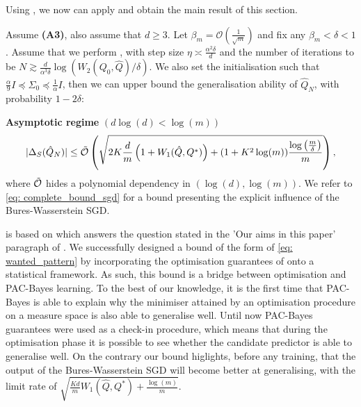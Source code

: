 Using , we now can apply  and obtain the main result of this section.
\begin{theorem}
\label{th: main_sgd}
Assume \textbf{(A3)}, also assume that $d\geq 3$. Let $\beta_m= \mathcal{O}(\frac{1}{\sqrt{m}})$ and fix any $\beta_m<\delta<1$.
Assume that we perform , with step size $\eta \asymp \frac{\alpha^2 \delta}{d}$ and the number of iterations to be $N \gtrsim \frac{d}{\alpha^3 \delta} \log \left(W_2\left(Q_0, \hat{Q}\right) / \delta\right)$.
We also set the initialisation such that $\frac{\alpha}{9} I \preceq \Sigma_{0} \preceq \frac{1}{\alpha} I$,
then we can upper bound the generalisation ability of $\hat{Q}_N$, with probability $1-2\delta$:

\noindent \textbf{Asymptotic regime} $(d\log(d)< \log(m))$
\begin{align*}
|\Delta_S(\hat{Q}_N)|  \leq\Tilde{\mathcal{O}}\left( \sqrt{2K\frac{d}{m}\left(1 + W_1(\hat{Q},Q^*)\right)+ (1+K^2\log(m)) \frac{\log\left( \frac{m}{\delta} \right)}{m}} \right),
\end{align*}
where $\Tilde{\mathcal{O}}$ hides a polynomial dependency in $(\log(d),\log(m))$. We refer to \eqref{eq: complete_bound_sgd} for a bound presenting the explicit influence of the Bures-Wasserstein SGD.
\end{theorem}
 is based on  which answers the question stated in the 'Our aims in this paper' paragraph of . We successfully designed a bound of the form of \eqref{eq: wanted_pattern} by incorporating the optimisation guarantees of \citet{lambert2022variational} onto a statistical framework.
As such, this bound is a bridge between optimisation and PAC-Bayes learning. To the best of our knowledge, it is the first time that PAC-Bayes is able to explain why the minimiser attained by an optimisation procedure on a measure space is also able to generalise well. Until now PAC-Bayes guarantees were used as a check-in procedure, which means that during the optimisation phase it is possible to see whether the candidate predictor is able to generalise well. On the contrary our bound higlights, before any training, that the output of the Bures-Wasserstein SGD will become better at generalising, with the limit rate of $\sqrt{\frac{Kd}{m}W_1(\hat{Q},Q^*) + \frac{\log(m)}{m}}$.
\medskip

